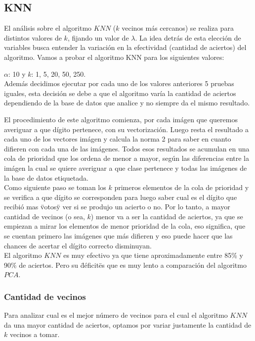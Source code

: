\subsection{KNN}
El análisis sobre el algoritmo $KNN$ ($k$ vecinos más cercanos) se realiza para distintos valores de $k$, fijando un valor de $\lambda$. La idea detrás de esta elección de variables busca entender la variación en la efectividad (cantidad de aciertos) del algoritmo.
Vamos a probar el algoritmo KNN para los siguientes valores:

$\alpha$: 10  y $k$: 1, 5, 20, 50, 250.\\

Además decidimos ejecutar por cada uno de los valores anteriores 5 pruebas iguales, esta decisión se debe a que el algoritmo varía la cantidad de aciertos dependiendo de la base de datos que analice y no siempre da el mismo resultado.

El procedimiento de este algoritmo comienza, por cada imágen que queremos averiguar a que dígito pertenece, con su vectorización. Luego resta el resultado a cada uno de los vectores imágen y calcula la norma 2 para saber en cuanto difieren con cada una de las imágenes.
Todos esos resultados se acumulan en una cola de prioridad que los ordena de menor a mayor, según las diferencias entre la imágen la cual se quiere averiguar a que clase pertenece y todas las imágenes de la base de datos etiquetada.
\\
Como siguiente paso se toman los $k$ primeros elementos de la cola de prioridad y se verifica a que dígito se corresponden para luego saber cual es el dígito que recibió mas \"votos\" y ver si se produjo un acierto o no.
Por lo tanto, a mayor cantidad de vecinos (o sea, $k$) menor va a ser la cantidad de aciertos, ya que se empiezan a mirar los elementos de menor prioridad de la cola, eso significa, que se cuentan primero las imágenes que más difieren y eso puede hacer que las chances de acertar el dígito correcto disminuyan.
\\
El algoritmo $KNN$ es muy efectivo ya que tiene aproximadamente entre 85\% y 90\% de aciertos. Pero su \"déficit\" es que es muy lento a comparación del algoritmo $PCA$. 

\subsubsection{Cantidad de vecinos}
Para analizar cual es el mejor número de vecinos para el cual el algoritmo $KNN$  da una mayor cantidad de aciertos, optamos por variar justamente la cantidad de $k$ vecinos a tomar.

